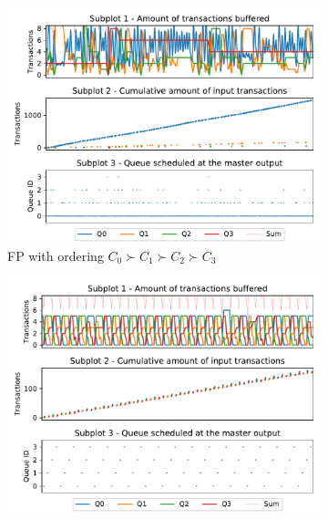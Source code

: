     \begin{figure}[t]
      \centering
      \begin{subfigure}{0.45\textwidth}
        \centering
        \includegraphics[scale=0.45]{images/SchIM_FP_buffering.pdf}
        \caption{FP with ordering $C_{0} \succ C_{1} \succ C_{2} \succ C_{3}$}
        \label{fig:schim_behaviour_fp}
      \end{subfigure}
      \hfill
      \begin{subfigure}{0.45\textwidth}
        \centering
        \includegraphics[scale=0.45]{images/SchIM_TDMA_buffering.pdf}

\end{subfigure}
\end{figure}

